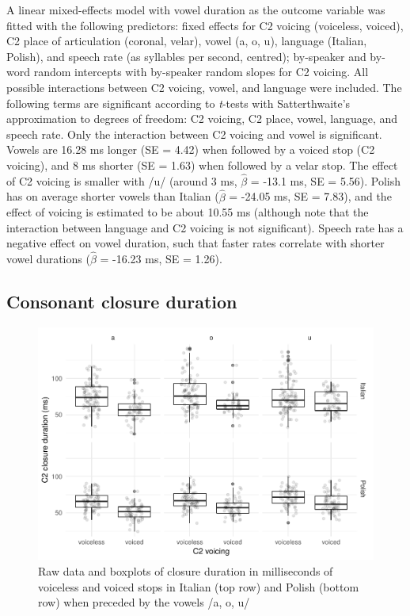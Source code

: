 \documentclass[charis]{glossa}
\begin{document}
A linear mixed-effects model with vowel duration as the outcome variable
was fitted with the following predictors: fixed effects for C2 voicing
(voiceless, voiced), C2 place of articulation (coronal, velar), vowel
(a, o, u), language (Italian, Polish), and speech rate (as syllables per
second, centred); by-speaker and by-word random intercepts with
by-speaker random slopes for C2 voicing. All possible interactions
between C2 voicing, vowel, and language were included. The following
terms are significant according to \emph{t}-tests with Satterthwaite's
approximation to degrees of freedom: C2 voicing, C2 place, vowel,
language, and speech rate. Only the interaction between C2 voicing and
vowel is significant. Vowels are 16.28 ms longer (SE = 4.42) when
followed by a voiced stop (C2 voicing), and 8 ms shorter (SE = 1.63)
when followed by a velar stop. The effect of C2 voicing is smaller with
/u/ (around 3 ms, \(\hat{\beta}\) = -13.1 ms, SE = 5.56). Polish has on
average shorter vowels than Italian (\(\hat{\beta}\) = -24.05 ms, SE =
7.83), and the effect of voicing is estimated to be about 10.55 ms
(although note that the interaction between language and C2 voicing is
not significant). Speech rate has a negative effect on vowel duration,
such that faster rates correlate with shorter vowel durations
(\(\hat{\beta}\) = -16.23 ms, SE = 1.26).

\hypertarget{consonant-closure-duration}{%
\subsection{Consonant closure
duration}\label{consonant-closure-duration}}

\label{s:cduration}

\begin{figure}
\includegraphics[width=\linewidth]{2018-relrel_files/figure-latex/Figure3} \caption{Raw data and boxplots of closure duration in milliseconds of voiceless and voiced stops in Italian (top row) and Polish (bottom row) when preceded by the vowels /a, o, u/}\label{f:Figure3}
\end{figure}
\end{document}
